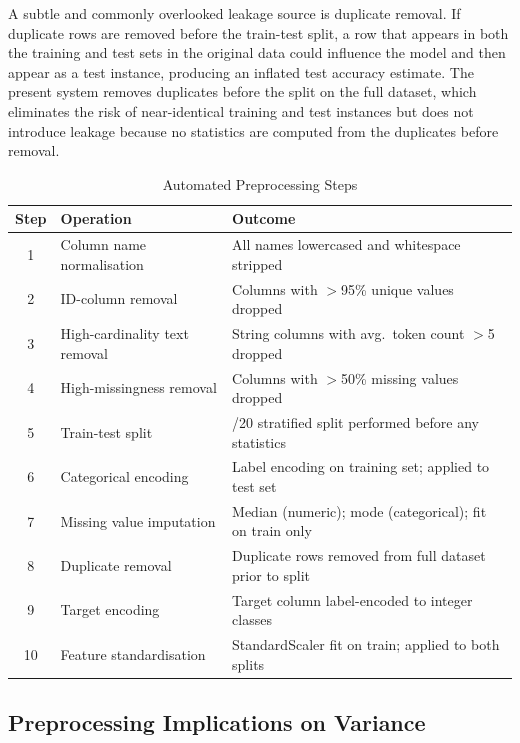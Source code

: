 \documentclass[conference]{IEEEtran}
\begin{document}
A subtle and commonly overlooked leakage source is duplicate removal. If duplicate rows are removed before the train-test split, a row that appears in both the training and test sets in the original data could influence the model and then appear as a test instance, producing an inflated test accuracy estimate. The present system removes duplicates before the split on the full dataset, which eliminates the risk of near-identical training and test instances but does not introduce leakage because no statistics are computed from the duplicates before removal.


\begin{table}[t]
    \caption{Automated Preprocessing Steps}
    \label{tab:preprocessing}
    \centering
    \small
    \renewcommand{\arraystretch}{1.3}
    \begin{tabular}{|c|>{\raggedright\arraybackslash}p{1.4in}|>{\raggedright\arraybackslash}p{1.4in}|}
    \hline
    \textbf{Step} & \textbf{Operation} & \textbf{Outcome} \\
    \hline
    1 & Column name normalisation & All names lowercased and whitespace stripped \\
    \hline
    2 & ID-column removal & Columns with $>$95\% unique values dropped \\
    \hline
    3 & High-cardinality text removal & String columns with avg.\ token count $>$5 dropped \\
    \hline
    4 & High-missingness removal & Columns with $>$50\% missing values dropped \\
    \hline
    5 & Train-test split & 80/20 stratified split performed before any statistics \\
    \hline
    6 & Categorical encoding & Label encoding on training set; applied to test set \\
    \hline
    7 & Missing value imputation & Median (numeric); mode (categorical); fit on train only \\
    \hline
    8 & Duplicate removal & Duplicate rows removed from full dataset prior to split \\
    \hline
    9 & Target encoding & Target column label-encoded to integer classes \\
    \hline
    10 & Feature standardisation & StandardScaler fit on train; applied to both splits \\
    \hline
    \end{tabular}
\end{table}

\subsection{Preprocessing Implications on Variance}
\end{document}
